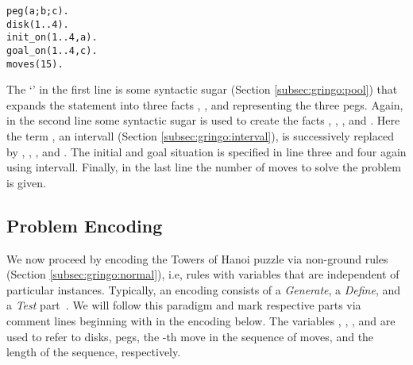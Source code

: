\begin{lstlisting}
peg(a;b;c).
disk(1..4).
init_on(1..4,a).
goal_on(1..4,c).
moves(15).
\end{lstlisting}

The `\code{;}' in the first line is some syntactic sugar (Section \ref{subsec:gringo:pool})
that expands the statement into three facts
, , and  representing the three pegs.
Again, in the second line some syntactic sugar is used to 
create the facts , , , and .
Here the term , an intervall (Section \ref{subsec:gringo:interval}), is successively replaced by , , , and .
The initial and goal situation is specified in line three and four again using intervall.
Finally, in the last line the number of moves to solve the problem is given.

\subsection{Problem Encoding}

We now proceed by encoding the Towers of Hanoi puzzle via non-ground rules (Section \ref{subsec:gringo:normal}), 
i.e, rules with variables that are independent of particular instances.
Typically, an encoding consists of a \emph{Generate}, a \emph{Define},
and a \emph{Test} part~\cite{lifschitz02a}.
We will follow this paradigm and
mark respective parts via comment lines beginning with \code{\%} in the encoding below.
The variables , , , and  are used
to refer to disks, pegs, the -th move in the sequence of moves, and the length of the sequence, respectively.

